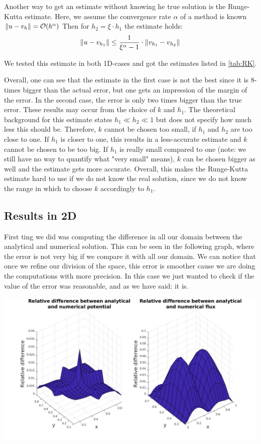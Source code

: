 \documentclass{article}
\begin{document}
	Another way to get an estimate without knowing he true solution is the Runge-Kutta estimate.
	Here, we assume the convergence rate $\alpha$ of a method is known $ \norm{u-v_h} = \mathcal{O}(h^\alpha)$
	Then for $h_2 = \xi\cdot h_1$ the estimate holds:
	\begin{equation*}
	\norm{u - v_{h_1}} \leq \frac{1}{\xi^\alpha -1} \cdot \norm {v_{h_1} - v_{h_2}}
	\end{equation*}
	
	We tested this estimate in both 1D-cases and got the estimates listed in \autoref{tab:RK}.
	
	Overall, one can see that the estimate in the first case is not the best since it is 8-times bigger than the actual error, but one gets an impression of the margin of the error.
	In the second case, the error is only two times bigger than the true error.
	These results may occur from the choice of $k$ and $h_1$.
	The theoretical background for this estimate states $h_1 \ll h_2 \ll 1$ but does not specify how much less this should be. 
	Therefore, $k$ cannot be chosen too small, if $h_1$ and $h_2$ are too close to one. 
	If $h_1$ is closer to one, this results in a less-accurate estimate and $k$ cannot be chosen to be too big. 
	If $h_1$ is really small compared to one (note: we still have no way to quantify what "very small" means), $k$ can be chosen bigger as well and the estimate gets more accurate.
	Overall, this makes the Runge-Kutta estimate hard to use if we do not know the real solution, since we do not know the range in which to choose $k$ accordingly to $h_1$.
	
	
	\subsection*{Results in 2D}
	First ting we did was computing the difference in all our domain between the analytical and numerical solution. This can be seen in the following graph, where the error is not very big if we compare it with all our domain. We can notice that once we refine our division of the space, this error is smoother cause we are doing the computations with more precision. In this case we just wanted to check if the value of the error was reasonable, and as we have said: it is.
	
	\begin{center}
		\includegraphics[width = 0.9\linewidth]{../Images/relativeerror.jpg}
	\end{center}
	
\end{document}
